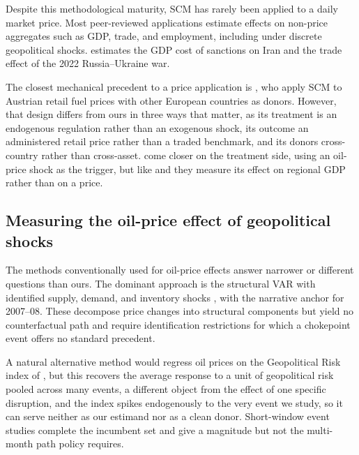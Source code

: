 Despite this methodological maturity, SCM has rarely been applied to a daily market
price. Most peer-reviewed applications estimate effects on non-price aggregates
such as GDP, trade, and employment, including under discrete geopolitical shocks.
\citet{gharehgozli2017} estimates the GDP cost of sanctions on Iran and
\citet{mancini2024} the trade effect of the 2022 Russia--Ukraine war. 

The closest
mechanical precedent to a price application is \citet{becker2021}, who apply SCM to
Austrian retail fuel prices with other European countries as donors. However, that design differs
from ours in three ways that matter, as its treatment is an endogenous regulation rather
than an exogenous shock, its outcome an administered retail price rather than a traded
benchmark, and its donors cross-country rather than cross-asset. \citet{juarez2024} come
closer on the treatment side, using an oil-price shock as the trigger, but like
\citet{gharehgozli2017} and \citet{mancini2024} they measure its effect on regional GDP
rather than on a price.

\subsection{Measuring the oil-price effect of geopolitical shocks}
The methods conventionally used for oil-price effects answer narrower or different
questions than ours. The dominant approach is the structural VAR with identified supply,
demand, and inventory shocks \citep{kilian2009,baumeisterhamilton2019}, with
\citet{hamilton2009} the narrative anchor for 2007--08. These decompose price changes
into structural components but yield no counterfactual path and require identification
restrictions for which a chokepoint event offers no standard precedent. 

A natural
alternative method would regress oil prices on the Geopolitical Risk index of
\citet{caldara2022}, but this recovers the average response to a unit of
geopolitical risk pooled across many events, a different object from the effect of one
specific disruption, and the index spikes endogenously to the very event we study, so it
can serve neither as our estimand nor as a clean donor. Short-window event studies
\citep{brownwarner1985} complete the incumbent set and give a magnitude but not the
multi-month path policy requires.

